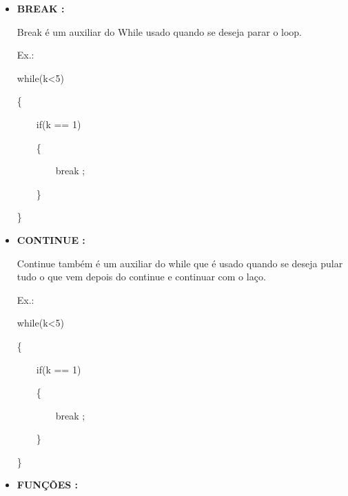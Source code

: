 \documentclass[a4paper]{article}
\begin{document}
{{{{{\begin{itemize}
            \{
            
            \ \ \ \  say("Hello!!");
            \ \ \ \  a = a+1;
            
            \}
        
        \bigskip
            
        \item \textbf{BREAK :}
            
            Break é um auxiliar do While usado quando se 
            deseja parar o loop.
            
            \textcolor{NavyBlue}{Ex.:}
            
            while(k<5)
            
            \{
            
            \ \ \ \ if(k == 1)
              
            \ \ \ \ \{
              
            \ \ \ \ \ \ \ \ \textcolor{NavyBlue}{break}
                    ;
              
            \ \ \ \ \}
           
            \}
        
\newpage %
            
        \item \textbf{CONTINUE :}
            
            Continue também é um auxiliar do while que é
            usado quando se deseja pular tudo o que vem
            depois do continue e continuar com o laço.
            
            \textcolor{NavyBlue}{Ex.:}
            
            while(k<5)
            
            \{
            
            \ \ \ \ if(k == 1)
              
            \ \ \ \ \{
              
            \ \ \ \ \ \ \ \ \textcolor{NavyBlue}{break}
                    ;
              
            \ \ \ \ \}
           
            \}
        
        \bigskip   
                           
        \item \textbf{FUNÇÕES :}
            

\end{itemize}}}}}}
\end{document}
